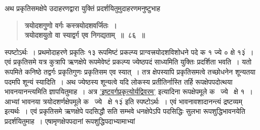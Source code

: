\documentclass[11pt, openany]{book}
\begin{document}
\begin{sloppypar}
{\small अथ प्रकृतिसमक्षेपे उदाहरणद्वारा युक्तिं प्रदर्शयितुमुदाहरणमनुष्टुभाह\textendash }

 \label{6.86}
\begin{quote}
{\large \textbf{{\color{purple}त्रयोदशगुणो वर्गः कस्त्रयोदशवर्जितः~।\\
त्रयोदशयुतो वा स्याद्वर्ग एव निगद्यताम्~॥~८६~॥}}}
\end{quote}

स्पष्टोऽर्थः~। प्रथमोदाहरणे प्रकृतिः १३ रूपमिष्टं प्रकल्प्य प्राग्वत्त्रयोदशविशोधने पदे क १ ज्ये ० क्षे १३ं~। एवं प्रकृतिसमे यत्र कुत्रापि ऋणक्षेपे रूपमेवेष्टं प्रकल्प्य ज्येष्ठपदं साध्यमिति युक्तिः प्रदर्शिता भवति~। यतो रूपमिते कनिष्ठे तद्वर्गः प्रकृतिगुणः प्रकृतिसम एव स्यात्~। तत्र क्षेपस्यापि प्रकृतिसमत्वे तच्छोधनेन शून्यतया पदमपि शून्यं स्यादिति~। अथ ज्येष्ठस्य शून्यत्वे यदि लोकस्य प्रतीतिर्नास्ति तर्हि रूपक्षेपपदोत्थया भावनयानन्त्यमिति ज्ञापयितुमाह~। अत्र \hyperref[6.73]{'इष्टवर्गप्रकृत्योर्यद्विवरम्'} इत्यादिना रूपक्षेपमूले क \, ज्ये \, क्षे १~। आभ्यां भावनया त्रयोदशर्णक्षेपमूले क \, ज्ये \, क्षे १३ं इति स्पष्टोऽर्थः~। एवं भावनावशादानन्त्यं द्रष्टव्यम् इत्यर्थः~। एवं प्रकृतिसमे ऋणक्षेपे पदसिद्धौ सति सम्भवे धनक्षेपेऽपि पदसिद्धिः सुलभा रूपशुद्धिभावनयेति प्रदर्शयितुमाह~। एषामृणक्षेपपदानां रूपशुद्धिपदाभ्यामाभ्यां 
\end{sloppypar}
\end{document}
